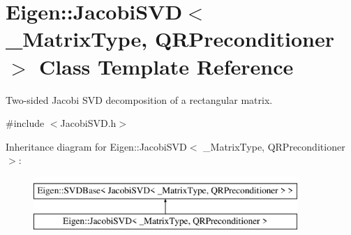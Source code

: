 \hypertarget{class_eigen_1_1_jacobi_s_v_d}{}\section{Eigen\+::Jacobi\+S\+VD$<$ \+\_\+\+Matrix\+Type, Q\+R\+Preconditioner $>$ Class Template Reference}
\label{class_eigen_1_1_jacobi_s_v_d}


Two-\/sided Jacobi S\+VD decomposition of a rectangular matrix.  




{\ttfamily \#include $<$Jacobi\+S\+V\+D.\+h$>$}

Inheritance diagram for Eigen\+::Jacobi\+S\+VD$<$ \+\_\+\+Matrix\+Type, Q\+R\+Preconditioner $>$\+:\begin{figure}[H]
\begin{center}
\leavevmode
\includegraphics[height=2.000000cm]{class_eigen_1_1_jacobi_s_v_d}
\end{center}
\end{figure}
